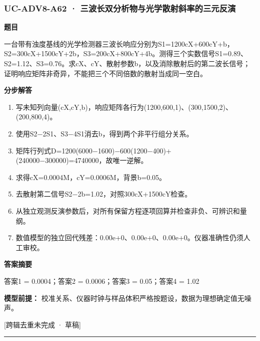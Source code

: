 \documentclass[UTF8,11pt,a4paper]{ctexart}
\begin{document}
\subsubsection*{UC-ADV8-A62 · 三波长双分析物与光学散射斜率的三元反演}
\noindent\textbf{题目}\par
一台带有浊度基线的光学检测器三波长响应分别为S1=1200cX+600cY+b，S2=300cX+1500cY+2b，S3=200cX+800cY+4b。测得三个实数信号S1=0.89、S2=1.12、S3=0.76。求cX、cY、散射参数b，以及消除散射后的第二波长信号；证明响应矩阵非奇异，不能把三个不同倍数的散射当成同一空白。\par
\medskip\noindent\textbf{分步解答}
\begin{enumerate}
\item 写未知列向量(cX,cY,b)，响应矩阵各行为(1200,600,1)、(300,1500,2)、(200,800,4)。
\item 使用S2−2S1、S3−4S1消去b，得到两个非平行组分关系。
\item 矩阵行列式D=1200(6000−1600)−600(1200−400)+(240000−300000)=4740000，故唯一逆解。
\item 求得cX=0.0004M，cY=0.0006M，背景b=0.05。
\item 去散射第二信号S2−2b=1.02，对照300cX+1500cY检查。
\item 从独立观测反演参数后，对所有保留方程逐项回算并检查非负、可辨识和量纲。
\item 数值模型的独立回代残差：0.00e+0、0.00e+0、0.00e+0。仪器准确性仍须人工审校。
\end{enumerate}
\noindent\textbf{答案摘要}\par
答案1 = 0.0004；答案2 = 0.0006；答案3 = 0.05；答案4 = 1.02\par
\noindent\textbf{模型前提：}
校准关系、仪器时钟与样品体积严格按题设，数据为理想确定值无噪声。\par
\noindent\textcolor{red!65!black}{[跨辑去重未完成 · 草稿]} \par
\medskip\hrule\medskip
{}
\end{document}
